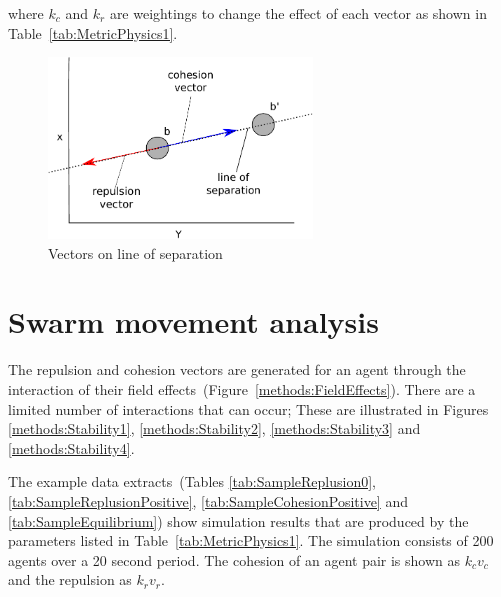 \documentclass[10pt,journal,letterpaper,twoside]{IEEEtran}
\begin{document}
where $k_c$ and $k_r$ are weightings to change the effect of each vector as shown in Table~\ref{tab:MetricPhysics1}.


\begin{figure}[H]
\begin{center}
\includegraphics[width=7cm]{figures/Stability5}
\end{center}
\caption{Vectors on line of separation} \label{methods:Stability5}
\end{figure}

\section{Swarm movement analysis\label{metric:MagnitudeDynamics2}}
The repulsion and cohesion vectors are generated for an agent through the interaction of their field effects~(Figure~\ref{methods:FieldEffects}). There are a limited number of interactions that can occur; These are illustrated in Figures \ref{methods:Stability1}, \ref{methods:Stability2}, \ref{methods:Stability3} and \ref{methods:Stability4}.

The example data extracts~(Tables \ref{tab:SampleReplusion0}, \ref{tab:SampleReplusionPositive}, \ref{tab:SampleCohesionPositive} and  \ref{tab:SampleEquilibrium}) show simulation results that are produced by the parameters listed in Table~\ref{tab:MetricPhysics1}. The simulation consists of 200 agents over a 20 second period. The cohesion of an agent pair is shown as $k_cv_c$ and the repulsion as $k_rv_r$.
\end{document}
